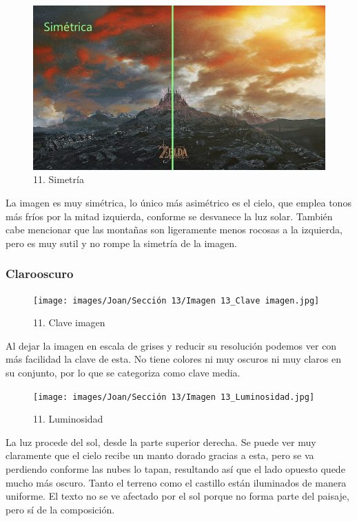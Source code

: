 \documentclass[12pt]{article}
\begin{document}
    \begin{figure}[H]
          \centering
          \includegraphics[scale=0.35]{images/Joan/Sección 13/Imagen 13_Simetría.jpg}
          \caption{\small 11. Simetría}
        \end{figure}
        La imagen es muy simétrica, lo único más asimétrico es el cielo, que emplea tonos más fríos por la mitad izquierda, conforme se desvanece la luz solar. También cabe mencionar que las montañas son ligeramente menos rocosas a la izquierda, pero es muy sutil y no rompe la simetría de la imagen. 

            \subsubsection{Clarooscuro}
            \begin{figure}[H]
          \centering
          \texttt{[image: images/Joan/Sección 13/Imagen 13\_Clave imagen.jpg]}
          \caption{\small 11. Clave imagen}
        \end{figure}
        Al dejar la imagen en escala de grises y reducir su resolución podemos ver con más facilidad la clave de esta. No tiene colores ni muy oscuros ni muy claros en su conjunto, por lo que se categoriza como clave media. 

        \begin{figure}[H]
          \centering
          \texttt{[image: images/Joan/Sección 13/Imagen 13\_Luminosidad.jpg]}
          \caption{\small 11. Luminosidad}
        \end{figure}

        La luz procede del sol, desde la parte superior derecha. Se puede ver muy claramente que el cielo recibe un manto dorado gracias a esta, pero se va perdiendo conforme las nubes lo tapan, resultando así que el lado opuesto quede mucho más oscuro. 
    Tanto el terreno como el castillo están iluminados de manera uniforme. El texto no se ve afectado por el sol porque no forma parte del paisaje, pero sí de la composición. 
\end{document}
